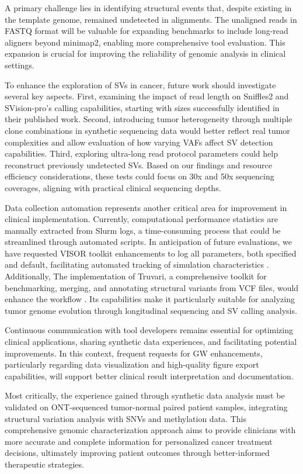 A primary challenge lies in identifying structural events that, despite 
existing in the template genome, remained undetected in alignments. The 
unaligned reads in FASTQ format will be valuable for expanding benchmarks to 
include long-read aligners beyond minimap2, enabling more comprehensive tool 
evaluation. This expansion is crucial for improving the reliability of genomic 
analysis in clinical settings.

To enhance the exploration of SVs in cancer, future work should investigate 
several key aspects. First, examining the impact of read length on Sniffles2 and 
SVision-pro's calling capabilities, starting with sizes successfully identified 
in their published work. Second, introducing tumor heterogeneity through 
multiple clone combinations in synthetic sequencing data would better reflect 
real tumor complexities and allow evaluation of how varying VAFs affect SV 
detection capabilities. Third, exploring ultra-long read protocol parameters 
could help reconstruct previously undetected SVs. Based on our findings and 
resource efficiency considerations, these tests could focus on 30x and 50x 
sequencing coverages, aligning with practical clinical sequencing depths.

Data collection automation represents another critical area for improvement in 
clinical implementation. Currently, computational performance statistics are 
manually extracted from Slurm logs, a time-consuming process that could be 
streamlined through automated scripts. In anticipation of future evaluations, 
we have requested VISOR toolkit enhancements to log all parameters, both 
specified and default, facilitating automated tracking of simulation 
characteristics \cite{noauthor_add_nodate}. Additionally, The implementation of 
Truvari, a comprehensive toolkit for benchmarking, merging, 
and annotating structural variants from VCF files, would enhance the workflow
\cite{english_truvari_2022}. Its capabilities make it 
particularly suitable for analyzing tumor genome evolution through longitudinal 
sequencing and SV calling analysis.

Continuous communication with tool developers remains essential for optimizing 
clinical applications, sharing synthetic data experiences, and facilitating 
potential improvements. In this context, frequent requests for GW enhancements, 
particularly regarding data visualization and high-quality figure export 
capabilities, will support better clinical result interpretation and 
documentation.

Most critically, the experience gained through synthetic data analysis must be 
validated on ONT-sequenced tumor-normal paired patient samples, integrating 
structural variation analysis with SNVs and methylation data. This comprehensive 
genomic characterization approach aims to provide clinicians with more accurate 
and complete information for personalized cancer treatment decisions, ultimately 
improving patient outcomes through better-informed therapeutic strategies.

